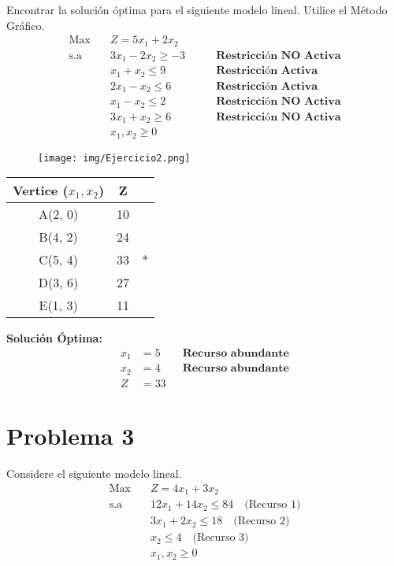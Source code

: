 \documentclass{templateNote}
\begin{document}
Encontrar la solución óptima para el siguiente modelo lineal. Utilice el Método Gráfico.
\begin{equation*}
    \begin{aligned}
        \text{Max} \quad & Z = 5x_1 + 2x_2 \\
        \text{s.a} \quad & 3x_1 - 2x_2 \geq -3 \qquad &\textbf{Restricci\'on NO Activa} \\
        & x_1 + x_2 \leq 9 \qquad &\textbf{Restricci\'on Activa} \\
        & 2x_1 - x_2 \leq 6 \qquad &\textbf{Restricci\'on Activa} \\
        & x_1 - x_2 \leq 2 \qquad &\textbf{Restricci\'on NO Activa} \\
        & 3x_1 + x_2 \geq 6 \qquad &\textbf{Restricci\'on NO Activa} \\
        & x_1, x_2 \geq 0
    \end{aligned}
\end{equation*}
\begin{figure}[H]
    \centering
    \texttt{[image: img/Ejercicio2.png]}
\end{figure}
\begin{center}
    \begin{tabular}{|c|c|c|}
        \hline
        \textbf{Vertice ($x_1,x_2$)} & Z &  \\ \hline
        A(2, 0) & 10 & \\ \hline
        B(4, 2) & 24 & \\ \hline
        C(5, 4) & 33 & * \\ \hline
        D(3, 6) & 27 & \\ \hline
        E(1, 3) & 11 & \\ \hline
    \end{tabular}
\end{center}

\textbf{Soluci\'on \'Optima:}
\begin{align*}
    x_1 &= 5 \qquad \textbf{Recurso abundante}\\ 
    x_2 &= 4 \qquad \textbf{Recurso abundante}\\
    Z &= 33
\end{align*}

\newpage
\section*{Problema 3}

Considere el siguiente modelo lineal.
\begin{equation*}
    \begin{aligned}
        \text{Max} \quad & Z = 4x_1 + 3x_2 \\
        \text{s.a} \quad & 12x_1 + 14x_2 \leq 84 \quad \text{(Recurso 1)} \\
        & 3x_1 + 2x_2 \leq 18 \quad \text{(Recurso 2)} \\
        & x_2 \leq 4 \quad \text{(Recurso 3)} \\
        & x_1, x_2 \geq 0
    \end{aligned}
\end{equation*}
\end{document}

